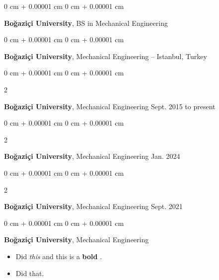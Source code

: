 \documentclass[10pt, letterpaper]{article}
\newenvironment{highlights}{
    \begin{itemize}[
        topsep=0.10 cm,
        parsep=0.10 cm,
        partopsep=0pt,
        itemsep=0pt,
        leftmargin=0 cm + 10pt
    ]
}{
    \end{itemize}
} %
\newenvironment{onecolentry}{
    \begin{adjustwidth}{
        0 cm + 0.00001 cm
    }{
        0 cm + 0.00001 cm
    }
}{
    \end{adjustwidth}
} %
\newenvironment{twocolentry}[2][]{
    \onecolentry
    \def\secondColumn{#2}
    \setcolumnwidth{\fill, 4.2cm}
    \begin{paracol}{2}
}{
    \switchcolumn \raggedleft \secondColumn
    \end{paracol}
    \endonecolentry
} %
\let\hrefWithoutArrow\href
\renewcommand{\href}[2]{\hrefWithoutArrow{#1}{\mbox{\ifthenelse{\equal{#2}{}}{ }{#2 }\raisebox{.15ex}{\footnotesize \faExternalLink*}}}}
\begin{document}
        \vspace{0.1 cm}

        \begin{onecolentry}
            \textbf{Boğaziçi University}, BS in Mechanical Engineering\end{onecolentry}


        \vspace{0.1 cm}

        \begin{onecolentry}
            \textbf{Boğaziçi University}, Mechanical Engineering -- Istanbul, Turkey\end{onecolentry}


        \vspace{0.1 cm}

        \begin{twocolentry}{
            Sept. 2015 to present
        }
            \textbf{Boğaziçi University}, Mechanical Engineering\end{twocolentry}


        \vspace{0.1 cm}

        \begin{twocolentry}{
            Jan. 2024
        }
            \textbf{Boğaziçi University}, Mechanical Engineering\end{twocolentry}


        \vspace{0.1 cm}

        \begin{twocolentry}{
            Sept. 2021
        }
            \textbf{Boğaziçi University}, Mechanical Engineering\end{twocolentry}


        \vspace{0.1 cm}

        \begin{onecolentry}
            \textbf{Boğaziçi University}, Mechanical Engineering    \begin{highlights}
                \item Did \textit{this} and this is a \textbf{bold} \href{https://example.com}{link}.
                \item Did that.
            \end{highlights}
        \end{onecolentry}


        \vspace{0.1 cm}
\end{document}
